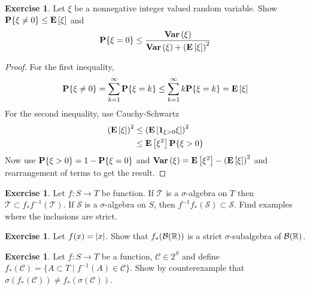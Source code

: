 \documentclass{amsart}
\theoremstyle{remark}
\theoremstyle{definition}
\newtheorem{ex}[thm]{Exercise}
\begin{document}
\begin{ex}Let $\xi$ be a nonnegative integer valued random variable.
  Show $\textbf{P}\{\xi \neq 0\} \leq \textbf{E}\left[\xi\right]$ and 
\begin{align*}
\textbf{P}\{\xi = 0\} \leq \frac{\textbf{Var} \left (\xi \right )}{\textbf{Var} \left (\xi \right ) + \left(\textbf{E}\left[\xi\right]\right)^2}
\end{align*}
\end{ex}
\begin{proof}
For the first inequality,
\begin{align*}
\textbf{P}\{\xi \neq 0\} = \sum_{k=1}^\infty \textbf{P}\{\xi = k\} \leq
\sum_{k=1}^\infty k\textbf{P}\{\xi = k\} = \textbf{E}\left[\xi\right]
\end{align*}
For the second inequality, use Cauchy-Schwartz
\begin{align*}
\left(\textbf{E}\left[\xi\right]\right)^2 &\leq
\left(\textbf{E}\left[\textbf{1}_{\xi > 0}\xi\right]\right)^2 \\
&\leq \textbf{E}\left[\xi^2\right] \textbf{P}\{\xi > 0\}
\end{align*}
Now use $\textbf{P}\{\xi > 0\} = 1 - \textbf{P}\{\xi=0\}$ and
$\textbf{Var} \left (\xi \right ) = \textbf{E}\left[\xi^2\right] -
\left(\textbf{E}\left[\xi\right]\right)^2$ and rearrangement of terms to get
the result.
\end{proof}

\begin{ex}Let $f : S \to T$ be function.  If $\mathcal{T}$ is a
  $\sigma$-algebra on $T$ then $\mathcal{T} \subset f_*
  f^{-1}(\mathcal{T})$.  If $\mathcal{S}$ is a $\sigma$-algebra on
  $S$, then $f^{-1}f_*(\mathcal{S}) \subset \mathcal{S}$.  Find examples where the inclusions are strict.
\end{ex}
\begin{ex}Let $f(x) = \left \vert x \right \vert$.  Show that $f_*(\mathcal{B}(\mathbb{R}))$
  is a strict $\sigma$-subalgebra of $\mathcal{B}(\mathbb{R})$.
\end{ex}
\begin{ex}Let $f : S \to T$ be a function, $\mathcal{C} \in
  2^S$ and define $f_*(\mathcal{C}) =  \{A \subset T \mid
    f^{-1}(A) \in \mathcal{C} \}$.  Show by counterexample that
    $\sigma(f_*(\mathcal{C})) \neq f_*(\sigma(\mathcal{C}))$.
\end{ex}
\end{document}

